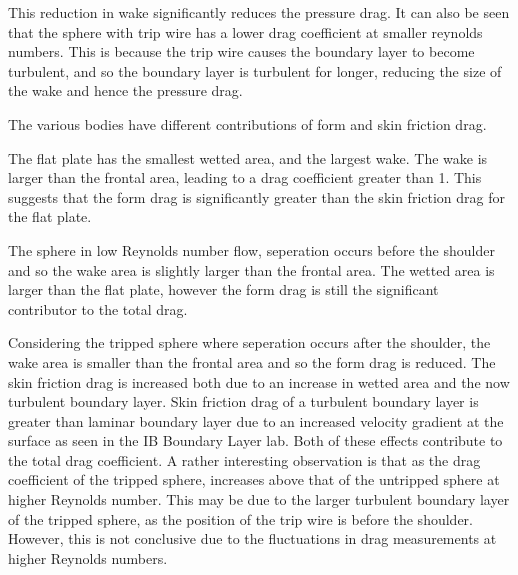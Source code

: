 \documentclass[8pt]{article}
\begin{document}
This reduction in wake significantly reduces the pressure drag.
It can also be seen that the sphere with trip wire has a lower drag coefficient at smaller reynolds numbers.
This is because the trip wire causes the boundary layer to become turbulent, and so the boundary layer is turbulent for longer, reducing the size of the wake and hence the pressure drag.




The various bodies have different contributions of form and skin friction drag.

The flat plate has the smallest wetted area, and the largest wake. The wake is larger than the frontal area, leading to a drag coefficient greater than 1.
This suggests that the form drag is significantly greater than the skin friction drag for the flat plate.

The sphere in low Reynolds number flow, seperation occurs before the shoulder and so the wake area is slightly larger than the frontal area.
The wetted area is larger than the flat plate, however the form drag is still the significant contributor to the total drag.

Considering the tripped sphere where seperation occurs after the shoulder, the wake area is smaller than the frontal area and so the form drag is reduced.
The skin friction drag is increased both due to an increase in wetted area and the now turbulent boundary layer.
Skin friction drag of a turbulent boundary layer is greater than laminar boundary layer due to an increased velocity gradient at the surface as seen in the IB Boundary Layer lab.
Both of these effects contribute to the total drag coefficient.
A rather interesting observation is that as the drag coefficient of the tripped sphere, increases above that of the untripped sphere at higher Reynolds number.
This may be due to the larger turbulent boundary layer of the tripped sphere, as the position of the trip wire is before the shoulder.
However, this is not conclusive due to the fluctuations in drag measurements at higher Reynolds numbers.
\end{document}
